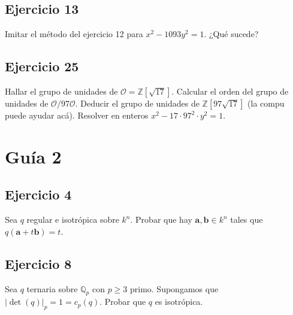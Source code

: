\documentclass[12pt]{amsart}
\newcommand{\QQ}{\mathbb{Q}}
\newcommand{\ZZ}{\mathbb{Z}}
\newcommand{\aaa}{\mathbf{a}}
\newcommand{\bbb}{\mathbf{b}}
\newcommand{\OO}{\mathcal{O}}
\newcommand{\lp}{\left(}
\newcommand{\rp}{\right)}
\theoremstyle{plain}
\begin{document}
\subsection*{Ejercicio 13}
Imitar el método del ejercicio 12 para $x^2 - 1093y^2 = 1$. 
¿Qué sucede?




\subsection*{Ejercicio 25}
Hallar el grupo de unidades de $\OO = \ZZ[\sqrt{17}]$. 
Calcular el orden del grupo de unidades de $\OO/97\OO$. 
Deducir el grupo de unidades de $\ZZ[97\sqrt{17}]$ 
(la compu puede ayudar acá). Resolver en enteros 
$x^2-17\cdot 97^2\cdot y^2=1$.

\section*{Guía 2}


\subsection*{Ejercicio 4}
Sea $q$ regular e isotrópica sobre $k^n$. Probar que hay 
$\aaa, \bbb \in k^n$ tales que $q \lp \aaa + t \bbb \rp = t$.

\subsection*{Ejercicio 8}
Sea $q$ ternaria sobre $\QQ_p$ con $p \geq 3$ primo. 
Supongamos que $|\det(q) |_p = 1 = c_p(q)$. Probar que $q$ es isotrópica.
\end{document}
